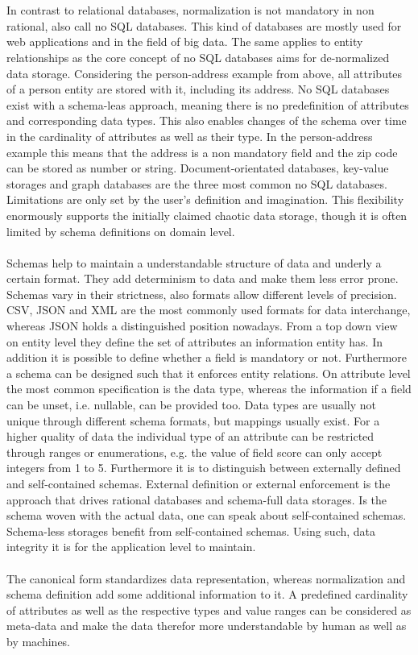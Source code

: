 \\\\
In contrast to relational databases, normalization is not mandatory in non rational, also call no SQL databases. This kind of databases are mostly used for web applications and in the field of big data. The same applies to entity relationships as the core concept of no SQL databases aims for de-normalized data storage. Considering the person-address example from above, all attributes of a person entity are stored with it, including its address. No SQL databases exist with a schema-leas approach, meaning there is no predefinition of attributes and corresponding data types. This also enables changes of the schema over time in the cardinality of attributes as well as their type. In the person-address example this means that the address is a non mandatory field and the zip code can be stored as number or string. Document-orientated databases, key-value storages and graph databases are the three most common no SQL databases.  Limitations are only set by the user's definition and imagination. This flexibility enormously supports the initially claimed chaotic data storage, though it is often limited by schema definitions on domain level. 
\\\\
Schemas help to maintain a understandable structure of data and underly a certain format. They add determinism to data and make them less error prone. Schemas vary in their strictness, also formats allow different levels of precision. CSV, JSON and XML are the most commonly used formats for data interchange, whereas JSON holds a distinguished position nowadays. From a top down view on entity level they define the set of attributes an information entity has. In addition it is possible to define whether a field is mandatory or not. Furthermore a schema can be designed such that it enforces entity relations. On attribute level the most common specification is the data type, whereas the information if a field can be unset, i.e. nullable, can be provided too. Data types are usually not unique through different schema formats, but mappings usually exist. For a higher quality of data the individual type of an attribute can be restricted through ranges or enumerations, e.g. the value of field score can only accept integers from 1 to 5. Furthermore it is to distinguish between externally defined and self-contained schemas. External definition or external enforcement is the approach that drives rational databases and schema-full data storages. Is the schema woven with the actual data, one can speak about self-contained schemas. Schema-less storages benefit from self-contained schemas. Using such, data integrity it is for the application level to maintain.
\\\\
The canonical form standardizes data representation, whereas normalization and schema definition add some additional information to it. A predefined cardinality of attributes as well as the respective types and value ranges can be considered as meta-data and make the data therefor more understandable by human as well as by machines. 

